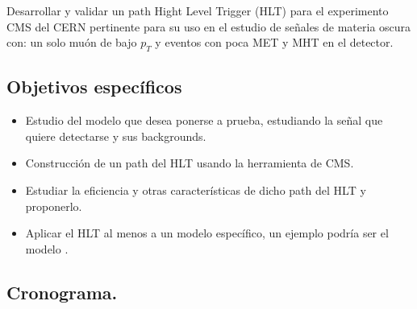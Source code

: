 Desarrollar y validar un path Hight Level Trigger (HLT) para el experimento CMS del CERN pertinente para su uso en el estudio de señales de materia oscura con: un solo muón de bajo $p_T$ y eventos con poca MET y MHT en el detector.

\subsection{Objetivos específicos}

\begin{itemize}
	\item Estudio del modelo que desea ponerse a prueba, estudiando la señal que quiere detectarse y sus backgrounds.
	\item Construcción de un path del HLT usando la herramienta de CMS.
	\item Estudiar la eficiencia y otras características de dicho path del HLT y proponerlo.
	\item Aplicar el HLT al menos a un modelo específico, un ejemplo podría ser el modelo \cite{1475-7516-2016-03-048}.
\end{itemize}


\subsection{Cronograma.}

\begin{table}[h]
	\centering
\end{table}
\newpage


